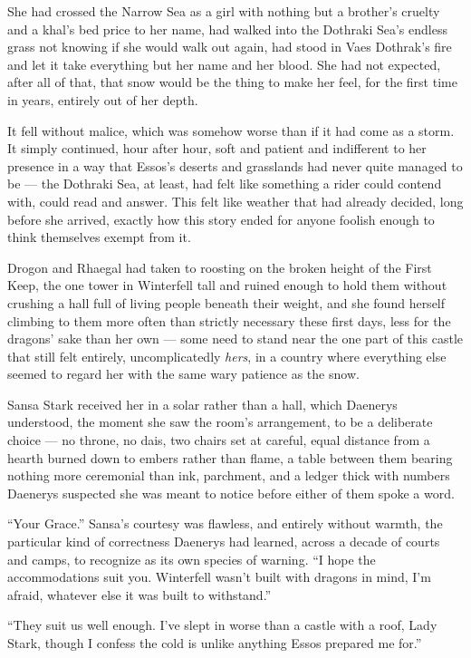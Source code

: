 She had crossed the Narrow Sea as a girl with nothing but a brother’s cruelty and a khal’s bed price to her name, had walked into the Dothraki Sea’s endless grass not knowing if she would walk out again, had stood in Vaes Dothrak’s fire and let it take everything but her name and her blood. She had not expected, after all of that, that snow would be the thing to make her feel, for the first time in years, entirely out of her depth.

It fell without malice, which was somehow worse than if it had come as a storm. It simply continued, hour after hour, soft and patient and indifferent to her presence in a way that Essos’s deserts and grasslands had never quite managed to be — the Dothraki Sea, at least, had felt like something a rider could contend with, could read and answer. This felt like weather that had already decided, long before she arrived, exactly how this story ended for anyone foolish enough to think themselves exempt from it.

Drogon and Rhaegal had taken to roosting on the broken height of the First Keep, the one tower in Winterfell tall and ruined enough to hold them without crushing a hall full of living people beneath their weight, and she found herself climbing to them more often than strictly necessary these first days, less for the dragons’ sake than her own — some need to stand near the one part of this castle that still felt entirely, uncomplicatedly \textit{hers}, in a country where everything else seemed to regard her with the same wary patience as the snow.

\sceneBreak

Sansa Stark received her in a solar rather than a hall, which Daenerys understood, the moment she saw the room’s arrangement, to be a deliberate choice — no throne, no dais, two chairs set at careful, equal distance from a hearth burned down to embers rather than flame, a table between them bearing nothing more ceremonial than ink, parchment, and a ledger thick with numbers Daenerys suspected she was meant to notice before either of them spoke a word.

“Your Grace.” Sansa’s courtesy was flawless, and entirely without warmth, the particular kind of correctness Daenerys had learned, across a decade of courts and camps, to recognize as its own species of warning. “I hope the accommodations suit you. Winterfell wasn’t built with dragons in mind, I’m afraid, whatever else it was built to withstand.”

“They suit us well enough. I’ve slept in worse than a castle with a roof, Lady Stark, though I confess the cold is unlike anything Essos prepared me for.”

